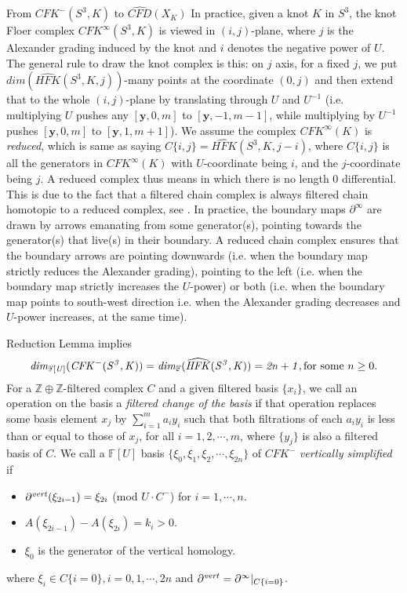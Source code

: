 \documentclass[11pt,reqno]{amsart}
\theoremstyle{definition}
\newtheorem *{remark}{Remark}
\newcommand{\hfkhat}{\widehat{\mathit{HFK}}}
\newcommand{\cfkminus}{\mathit{CFK}^{-}}
\begin{document}
\begin{subsection}{From $CFK^{-}(S^3,K)$ to $\widehat{CFD}(X_K)$}
In practice, given a knot $K$ in $S^3$, the knot Floer complex $CFK^{\infty}(S^3,K)$ is viewed in $(i,j)$-plane, where $j$ is the Alexander grading induced by the knot and $i$ denotes the negative power of $U$. The general rule to draw the knot complex is this: on $j$ axis, for a fixed $j$, we put $dim(\hfkhat(S^3,K,j))$-many points at the coordinate $(0,j)$  and then extend that to the whole $(i,j)$-plane by translating through $U$ and $U^{-1}$ (i.e. multiplying $U$ pushes any $[\bm{y},0,m]$ to $[\bm{y},-1,m-1]$, while multiplying by $U^{-1}$ pushes $[\bm{y},0,m]$ to $[\bm{y},1,m+1]$). We assume the complex $CFK^{\infty}(K)$ is \textit{reduced}, which is same as saying $C\{i,j\} = \hfkhat(S^3,K,j-i)$, where $C\{i,j\}$ is all the generators in $CFK^{\infty}(K)$ with $U$-coordinate being $i$, and the $j$-coordinate being $j$. A reduced complex thus means in which there is no length $0$ differential.
This is due to the fact that a filtered chain complex is always filtered chain homotopic to a reduced complex, see \cite[Reduction Lemma]{hw18}. In practice, the boundary maps $\partial^{\infty}$ are drawn by arrows emanating from some generator(s), pointing towards the generator(s) that live(s) in their boundary. A reduced chain complex ensures that the boundary arrows are pointing downwards (i.e. when the boundary map strictly reduces the Alexander grading), pointing to the left (i.e. when the boundary map strictly increases the $U$-power) or both (i.e. when the boundary map points to south-west direction i.e. when the Alexander grading decreases and $U$-power increases, at the same time). 
 
Reduction Lemma implies
\begin{gather*}
  \it{dim}_{\mathbb{F}[U]}(\cfkminus(S^3,K)) = \it{dim}_{\mathbb{F}}(\hfkhat(S^3,K)) = 2n +1, \text{for some $n \ge 0$.}   
\end{gather*}
For a $\mathbb{Z}\oplus\mathbb{Z}$-filtered complex $C$ and a given filtered basis $\{x_i\}$, we call an operation on the basis a \emph{filtered change of the basis} if that operation replaces some basis element $x_j$ by $\sum_{i=1}^{m} a_i y_i$ such that both filtrations of each $a_iy_i$ is less than or equal to those of $x_j$, for all $i =1,2,\cdots, m$, where $\{y_j\}$ is also a filtered basis of $C$. 
We call a $\mathbb{F}[U]$ basis $\{ \xi_0, \xi_1,\xi_2, \cdots, \xi_{2n} \}$ of $\cfkminus$ \emph{vertically simplified} if
\begin{itemize}
    \item $\partial^{\it{vert}}(\xi_{2i -1}) = \xi_{2i}$ (mod $U \cdot C^{-}$) for $i=1,\cdots,n.$ 
    \item $A(\xi_{2i-1}) - A(\xi_{2i}) = k_i > 0.$
    \item $\xi_0$ is the generator of the vertical homology.
\end{itemize}
    where $\xi_i \in C\{i=0\}, i=0,1,\cdots,2n $ and $\partial^{\it{vert}} = \partial^{\infty}|_{C\{i=0\}}$.



\end{subsection}
\end{document}
